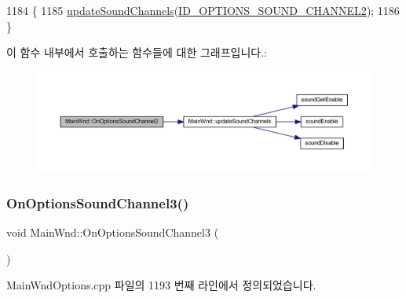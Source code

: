 \begin{DoxyCode}
1184 \{
1185   \mbox{\hyperlink{class_main_wnd_a30b67d9db53d79122684a81e549ebd1c}{updateSoundChannels}}(\mbox{\hyperlink{resource_8h_a4122313efe433202bea76a7c256ac41f}{ID\_OPTIONS\_SOUND\_CHANNEL2}});
1186 \}
\end{DoxyCode}
이 함수 내부에서 호출하는 함수들에 대한 그래프입니다.\+:
\nopagebreak
\begin{figure}[H]
\begin{center}
\leavevmode
\includegraphics[width=350pt]{class_main_wnd_a4f31de4544cb10e41968ccabfec95422_cgraph}
\end{center}
\end{figure}
\mbox{\label{class_main_wnd_afa834c32c467c4c0e60aeea35034336b}} 
\subsubsection{\texorpdfstring{On\+Options\+Sound\+Channel3()}{OnOptionsSoundChannel3()}}
{\footnotesize\ttfamily void Main\+Wnd\+::\+On\+Options\+Sound\+Channel3 (\begin{DoxyParamCaption}{ }\end{DoxyParamCaption})\hspace{0.3cm}{\ttfamily [protected]}}



Main\+Wnd\+Options.\+cpp 파일의 1193 번째 라인에서 정의되었습니다.


